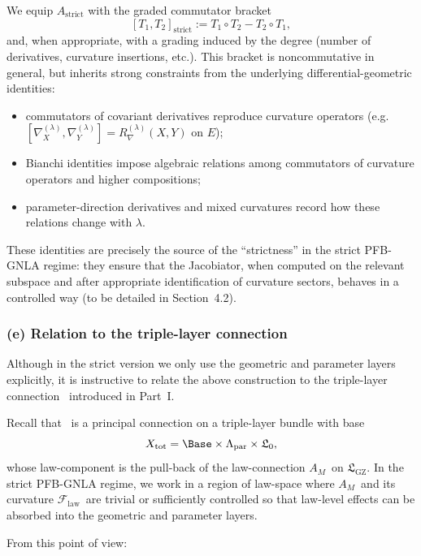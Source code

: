 \documentclass[11pt]{book}
\theoremstyle{plain}
\theoremstyle{definition}
\newcommand{\GZLS}{\ensuremath{\mathfrak{L}_{\mathrm{GZ}}}}       \newcommand{\GZLT}{\ensuremath{M_{!w}}}                           \newcommand{\GZLOC}{\ensuremath{A_M}}                             \newcommand{\GZLCurv}{\ensuremath{\mathcal{F}_{\mathrm{law}}}}
\begin{document}
We equip $A_{\mathrm{strict}}$ with the graded commutator bracket
\[
   [T_1,T_2]_{\mathrm{strict}}
   :=
   T_1\circ T_2 - T_2\circ T_1,
\]
and, when appropriate, with a grading induced by the degree (number of
derivatives, curvature insertions, etc.). This bracket is noncommutative
in general, but inherits strong constraints from the underlying
differential-geometric identities:

\begin{itemize}
  \item commutators of covariant derivatives reproduce curvature
        operators (e.g.\ $[\nabla^{(\lambda)}_X,
        \nabla^{(\lambda)}_Y] = R^{(\lambda)}_\nabla(X,Y)$ on $E$);
  \item Bianchi identities impose algebraic relations among
        commutators of curvature operators and higher compositions;
  \item parameter-direction derivatives and mixed curvatures record how
        these relations change with $\lambda$.
\end{itemize}

These identities are precisely the source of the “strictness” in the
strict PFB-GNLA regime: they ensure that the Jacobiator, when computed
on the relevant subspace and after appropriate identification of
curvature sectors, behaves in a controlled way (to be detailed in
Section~4.2).



\subsubsection*{(e) Relation to the triple-layer connection \texorpdfstring{\GZTLC}{GZ-TLC}}

Although in the strict version we only use the geometric and parameter
layers explicitly, it is instructive to relate the above construction
to the triple-layer connection \GZTLC\ introduced in Part~I.

Recall that \GZTLC\ is a principal connection on a triple-layer bundle
with base
\[
   X_{\mathrm{tot}}
   =
   \Base \times \Lambda_{\mathrm{par}} \times \mathfrak{L}_0,
\]
whose law-component is the pull-back of the law-connection \GZLOC\ on
\GZLS. In the strict PFB-GNLA regime, we work in a region of law-space
where \GZLOC\ and its curvature \GZLCurv\ are trivial or sufficiently
controlled so that law-level effects can be absorbed into the geometric
and parameter layers.

From this point of view:
\end{document}
